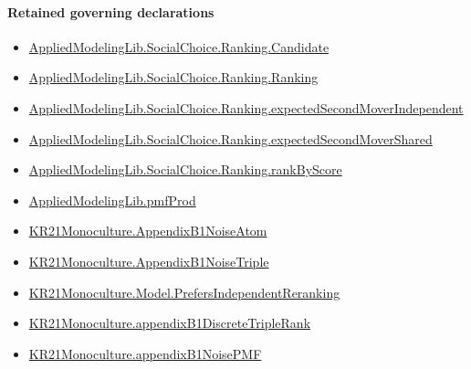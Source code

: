 \documentclass[10pt]{article}
\begin{document}
\paragraph{Retained governing declarations}
\begin{itemize}\raggedright
\item \hyperlink{library-prerequisite-8c0e6c25845ae78a}{Applied\allowbreak{}Modeling\allowbreak{}Lib.\allowbreak{}Social\allowbreak{}Choice.\allowbreak{}Ranking.\allowbreak{}Candidate}
\item \hyperlink{library-prerequisite-5cde54446d1ae021}{Applied\allowbreak{}Modeling\allowbreak{}Lib.\allowbreak{}Social\allowbreak{}Choice.\allowbreak{}Ranking.\allowbreak{}Ranking}
\item \hyperlink{governing-declaration-4f697449f42135d1}{Applied\allowbreak{}Modeling\allowbreak{}Lib.\allowbreak{}Social\allowbreak{}Choice.\allowbreak{}Ranking.\allowbreak{}expected\allowbreak{}Second\allowbreak{}Mover\allowbreak{}Independent}
\item \hyperlink{governing-declaration-864c9bb19be5af0d}{Applied\allowbreak{}Modeling\allowbreak{}Lib.\allowbreak{}Social\allowbreak{}Choice.\allowbreak{}Ranking.\allowbreak{}expected\allowbreak{}Second\allowbreak{}Mover\allowbreak{}Shared}
\item \hyperlink{governing-declaration-c2e98278351275b0}{Applied\allowbreak{}Modeling\allowbreak{}Lib.\allowbreak{}Social\allowbreak{}Choice.\allowbreak{}Ranking.\allowbreak{}rank\allowbreak{}By\allowbreak{}Score}
\item \hyperlink{governing-declaration-de8e2a8bfe221a38}{Applied\allowbreak{}Modeling\allowbreak{}Lib.\allowbreak{}pmf\allowbreak{}Prod}
\item \hyperlink{governing-declaration-792cef0e45be0c6d}{KR21\allowbreak{}Monoculture.\allowbreak{}Appendix\allowbreak{}B1\allowbreak{}Noise\allowbreak{}Atom}
\item \hyperlink{governing-declaration-772881b315f3e73e}{KR21\allowbreak{}Monoculture.\allowbreak{}Appendix\allowbreak{}B1\allowbreak{}Noise\allowbreak{}Triple}
\item \hyperlink{governing-declaration-1e94a697794c6dda}{KR21\allowbreak{}Monoculture.\allowbreak{}Model.\allowbreak{}Prefers\allowbreak{}Independent\allowbreak{}Reranking}
\item \hyperlink{governing-declaration-9b3602ab69aa6cf7}{KR21\allowbreak{}Monoculture.\allowbreak{}appendix\allowbreak{}B1\allowbreak{}Discrete\allowbreak{}Triple\allowbreak{}Rank}
\item \hyperlink{governing-declaration-ccbcf874b950aaac}{KR21\allowbreak{}Monoculture.\allowbreak{}appendix\allowbreak{}B1\allowbreak{}Noise\allowbreak{}PMF}

\end{itemize}
\end{document}
